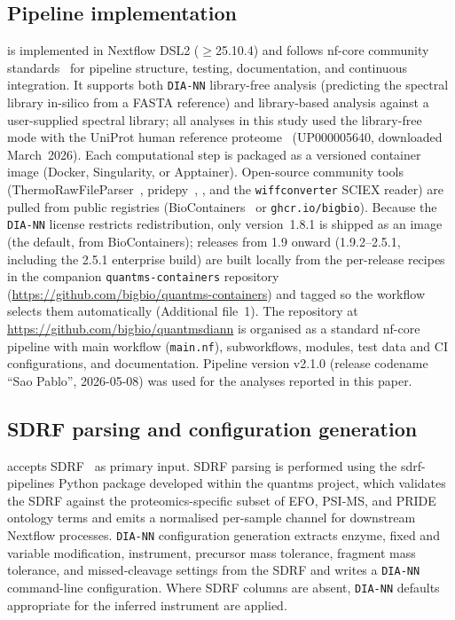 \subsection{Pipeline implementation}
\label{sec:impl}

\quantmsdiann{} is implemented in Nextflow DSL2 ($\geq$25.10.4) and follows nf-core community standards~\cite{ewels2020nfcore} for pipeline structure, testing, documentation, and continuous integration. It supports both \texttt{DIA-NN} library-free analysis (predicting the spectral library in-silico from a FASTA reference) and library-based analysis against a user-supplied spectral library; all analyses in this study used the library-free mode with the UniProt human reference proteome~\cite{uniprot2025} (UP000005640, downloaded March~2026). Each computational step is packaged as a versioned container image (Docker, Singularity, or Apptainer). Open-source community tools (ThermoRawFileParser~\cite{hulstaert2020}, pridepy~\cite{kamatchinathan2025pridepy}, \qpx{}, and the \texttt{wiffconverter} SCIEX reader) are pulled from public registries (BioContainers~\cite{biocontainers2017} or \texttt{ghcr.io/bigbio}).
Because the \texttt{DIA-NN} license restricts redistribution, only version~1.8.1 is shipped as an image (the default, from BioContainers); releases from 1.9 onward (1.9.2--2.5.1, including the 2.5.1 enterprise build) are built locally from the per-release recipes in the companion \texttt{quantms-containers} repository (\url{https://github.com/bigbio/quantms-containers}) and tagged so the workflow selects them automatically (Additional file~1).
The repository at \url{https://github.com/bigbio/quantmsdiann} is organised as a standard nf-core pipeline with main workflow (\texttt{main.nf}), subworkflows, modules, test data and CI configurations, and documentation.
Pipeline version v2.1.0 (release codename ``Sao Pablo'', 2026-05-08) was used for the analyses reported in this paper.

\subsection{SDRF parsing and configuration generation}
\quantmsdiann{} accepts SDRF~\cite{dai2021sdrf} as primary input.
SDRF parsing is performed using the sdrf-pipelines Python package developed within the quantms project, which validates the SDRF against the proteomics-specific subset of EFO, PSI-MS, and PRIDE ontology terms and emits a normalised per-sample channel for downstream Nextflow processes. \texttt{DIA-NN} configuration generation extracts enzyme, fixed and variable modification, instrument, precursor mass tolerance, fragment mass tolerance, and missed-cleavage settings from the SDRF and writes a \texttt{DIA-NN} command-line configuration.
Where SDRF columns are absent, \texttt{DIA-NN} defaults appropriate for the inferred instrument are applied.

